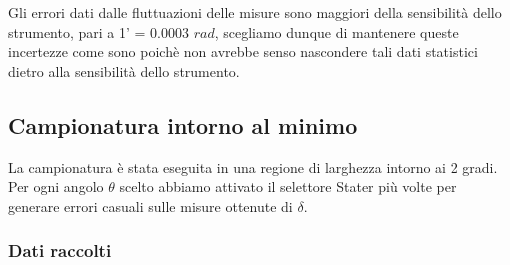 \documentclass[a4paper]{article}
\theoremstyle{definition}
\begin{document}
    \begin{figure}[!htbp]
    	\captionsetup{labelformat=empty}

    \end{figure}
\noindent Gli errori dati dalle fluttuazioni delle misure sono maggiori della sensibilità dello strumento, pari a 1' = 0.0003 $rad$, scegliamo dunque di mantenere queste incertezze come sono poichè non avrebbe senso nascondere tali dati statistici dietro alla sensibilità dello strumento.

\subsection{Campionatura intorno al minimo}
La campionatura è stata eseguita in una regione di larghezza intorno ai 2 gradi.\\Per ogni angolo $\theta$ scelto abbiamo attivato il selettore Stater più volte per generare errori casuali sulle misure ottenute di $\delta$.

\subsubsection{Dati raccolti}
\end{document}
